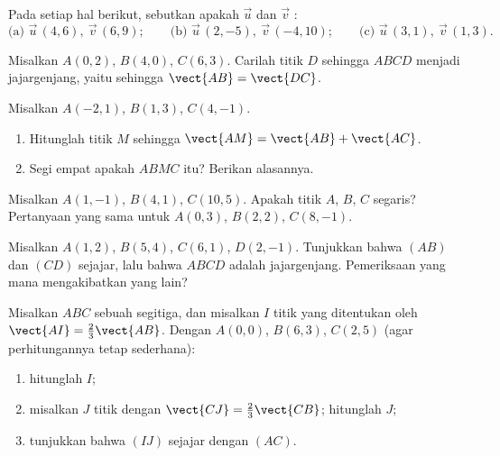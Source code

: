 \begin{exercise}[$\star$]\label{exo:g10:vectors:4}
Pada setiap hal berikut, sebutkan apakah $\vec u$ dan $\vec v$ :
\[
\text{(a) } \vec u\,(4, 6),\ \vec v\,(6, 9);
\qquad
\text{(b) } \vec u\,(2, -5),\ \vec v\,(-4, 10);
\qquad
\text{(c) } \vec u\,(3, 1),\ \vec v\,(1, 3).
\]
\end{exercise}

\begin{exercise}[$\star$]\label{exo:g10:vectors:5}
Misalkan $A(0, 2)$, $B(4, 0)$, $C(6, 3)$. Carilah  titik
$D$ sehingga $ABCD$ menjadi jajargenjang, yaitu sehingga
$\vect{AB} = \vect{DC}$.
\end{exercise}

\begin{exercise}[$\star\star$]\label{exo:g10:vectors:6}
Misalkan $A(-2, 1)$, $B(1, 3)$, $C(4, -1)$.
\begin{enumerate}
  \item Hitunglah  titik $M$ sehingga
        $\vect{AM} = \vect{AB} + \vect{AC}$.
  \item Segi empat apakah $ABMC$ itu? Berikan alasannya.
\end{enumerate}
\end{exercise}

\begin{exercise}[$\star\star$]\label{exo:g10:vectors:7}
Misalkan $A(1, -1)$, $B(4, 1)$, $C(10, 5)$. Apakah titik $A$, $B$, $C$
segaris? Pertanyaan yang sama untuk $A(0, 3)$, $B(2, 2)$, $C(8, -1)$.
\end{exercise}

\begin{exercise}[$\star\star$]\label{exo:g10:vectors:8}
Misalkan $A(1, 2)$, $B(5, 4)$, $C(6, 1)$, $D(2, -1)$. Tunjukkan bahwa $(AB)$
dan $(CD)$ sejajar, lalu bahwa $ABCD$ adalah jajargenjang. Pemeriksaan yang
mana mengakibatkan yang lain?
\end{exercise}

\begin{exercise}[$\star\star$]\label{exo:g10:vectors:9}
Misalkan $ABC$ sebuah segitiga, dan misalkan $I$ titik yang ditentukan oleh
$\vect{AI} = \frac23 \vect{AB}$. Dengan $A(0,0)$, $B(6, 3)$, $C(2, 5)$
(agar perhitungannya tetap sederhana):
\begin{enumerate}
  \item hitunglah  $I$;
  \item misalkan $J$ titik dengan $\vect{CJ} = \frac23\vect{CB}$; hitunglah
         $J$;
  \item tunjukkan bahwa $(IJ)$ sejajar dengan $(AC)$.
\end{enumerate}
\end{exercise}

